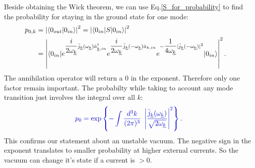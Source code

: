 \documentclass[12pt, titlepage]{article}
\begin{document}
Beside obtaining the Wick theorem,  we can use Eq.\enskip\eqref{S_for_probability} to find the probability for staying in the ground state for one mode:
\begin{subequations}
\begin{align}
p_{0,k}&=\left| \braket{0_{out}|0_{in}}\right|^{2}=\left| \braket{0_{in}|S|0_{in}}\right|^{2}
	&\\
	&=\left| \braket{0_{in}|e^{\dfrac{i}{2\omega_{\underline{k}}}\bar{j}_{\underline{k}}(\omega_{\underline{k}})\hat{a}^{\dagger}_{\underline{k},in}}
e^{\dfrac{i}{2\omega_{\underline{k}}}\bar{j}_{\underline{k}}(-\omega_{\underline{k}})\hat{a}_{k,in}}
e^{-\dfrac{1}{4\omega_{\underline{k}}}|\bar{j}_{\underline{k}}(-\omega_{\underline{k}})|^{2}}|0_{in}}\right|^{2}
.
\end{align}
\end{subequations}
The annihilation operator will return a $ 0 $ in the exponent. Therefore only one factor remain important. The probabilty while taking to account any mode transition just involves the integral over all $ k $:
\begin{equation}\label{prob_staying}
 \textcolor[RGB]{0,0,204}{
	p_{0}
	= 	\exp\left\lbrace -\int \dfrac{d^{3}k}{(2\pi)^{3}} \ 
 		 			 \left| \dfrac{\bar{j}_{\underline{k}}(\omega_{\underline{k}})}{\sqrt{2\omega_{\underline{k}}}} \right|^{2}
 		 			 \right\rbrace 
 .}
\end{equation}
This confirms our statement about an unstable vacuum. The negative sign in the exponent translates to smaller probability at higher external currents. So the vacuum can change it's state if a current is $ >0 $.
\end{document}
